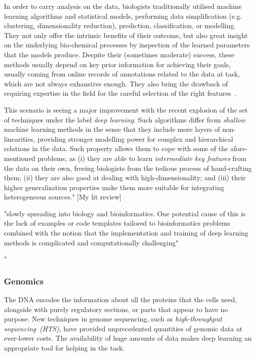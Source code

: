 In order to carry analysis on the data, biologists traditionally utilised machine learning algorithms and statistical models, performing data simplification (e.g. clustering, dimensionality reduction), prediction, classification, or modelling. They not only offer the intrinsic benefits of their outcome, but also great insight on the underlying bio-chemical processes by inspection of the learned parameters that the models produce. Despite their (sometimes moderate) success, these methods usually depend on key prior information for achieving their goals, usually coming from online records of annotations related to the data at task, which are not always exhaustive enough. They also bring the drawback of requiring expertise in the field for the careful selection of the right features~\cite{Libbrecht2015}.

This scenario is seeing a major improvement with the recent explosion of the set of techniques under the label \textit{deep learning}. Such algorithms differ from \textit{shallow} machine learning methods in the sense that they include more layers of non-linearities, providing stronger modelling power for complex and hierarchical relations in the data. Such property allows them to cope with some of the afore-mentioned problems, as (i) they are able to learn \textit{intermediate key features} from the data on their own, freeing biologists from the tedious process of hand-crafting them; (ii) they are also good at dealing with high-dimensionality; and (iii) their higher generalization properties make them more suitable for integrating heterogeneous sources." [My lit review]

"slowly spreading into biology and bioinformatics. One potential cause of this is the lack of examples or code templates tailored to bioinformatics problems combined with the notion that the implementation and training of deep learning methods is complicated and computationally challenging" \cite{Jurtz2017}

"
\subsubsection{Genomics}
The DNA encodes the information about all the proteins that the cells need, alongside with purely regulatory sections, or parts that appear to have no purpose. New techniques in genome sequencing, such as \textit{high-throughput sequencing~(HTS)}, have provided unprecedented quantities of genomic data at ever-lower costs. The availability of huge amounts of data makes deep learning an appropriate tool for helping in the task.

